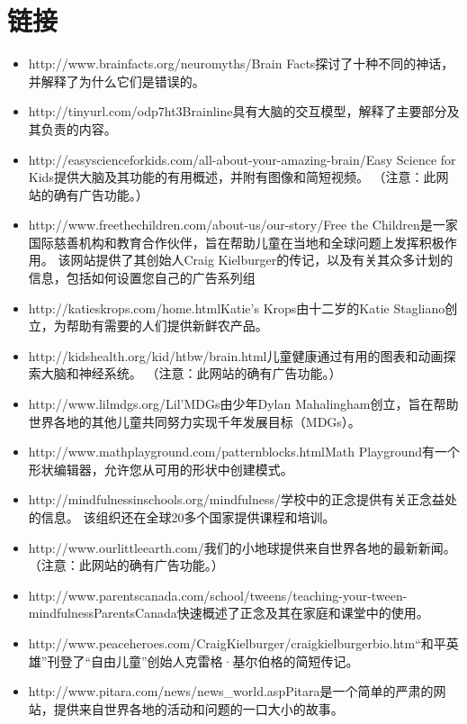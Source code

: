 \section{链接}
      \begin{itemize}
        \item http://www.brainfacts.org/neuromyths/Brain Facts探讨了十种不同的神话，并解释了为什么它们是错误的。
        \item http://tinyurl.com/odp7ht3Brainline具有大脑的交互模型，解释了主要部分及其负责的内容。
        \item http://easyscienceforkids.com/all-about-your-amazing-brain/Easy Science for Kids提供大脑及其功能的有用概述，并附有图像和简短视频。 （注意：此网站的确有广告功能。）
        \item http://www.freethechildren.com/about-us/our-story/Free the Children是一家国际慈善机构和教育合作伙伴，旨在帮助儿童在当地和全球问题上发挥积极作用。 该网站提供了其创始人Craig Kielburger的传记，以及有关其众多计划的信息，包括如何设置您自己的广告系列组
        \item http://katieskrops.com/home.htmlKatie's Krops由十二岁的Katie Stagliano创立，为帮助有需要的人们提供新鲜农产品。
        \item http://kidshealth.org/kid/htbw/brain.html儿童健康通过有用的图表和动画探索大脑和神经系统。 （注意：此网站的确有广告功能。）
        \item http://www.lilmdgs.org/Lil'MDGs由少年Dylan Mahalingham创立，旨在帮助世界各地的其他儿童共同努力实现千年发展目标（MDGs）。
        \item http://www.mathplayground.com/patternblocks.htmlMath Playground有一个形状编辑器，允许您从可用的形状中创建模式。
        \item http://mindfulnessinschools.org/mindfulness/学校中的正念提供有关正念益处的信息。 该组织还在全球20多个国家提供课程和培训。
        \item http://www.ourlittleearth.com/我们的小地球提供来自世界各地的最新新闻。 （注意：此网站的确有广告功能。）
        \item http://www.parentscanada.com/school/tweens/teaching-your-tween- mindfulnessParentsCanada快速概述了正念及其在家庭和课堂中的使用。
        \item http://www.peaceheroes.com/CraigKielburger/craigkielburgerbio.htm“和平英雄”刊登了“自由儿童”创始人克雷格·基尔伯格的简短传记。
        \item http://www.pitara.com/news/news_world.aspPitara是一个简单的严肃的网站，提供来自世界各地的活动和问题的一口大小的故事。

\end{itemize}
